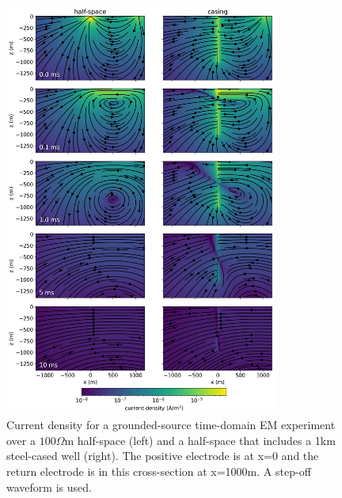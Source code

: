 \begin{figure}[!htb]
    \begin{center}
    \includegraphics[width=0.8\textwidth]{figures/tdem-currents-cross-section.png}
    \end{center}
\caption{
    Current density for a grounded-source time-domain EM experiment over a $100 \Omega$m half-space (left) and a half-space that includes a 1km steel-cased well (right). The positive electrode is at x=0 and the return electrode is in this cross-section at x=1000m. A step-off waveform is used.
}
\label{fig:tdem-currents-cross-section}
\end{figure}
